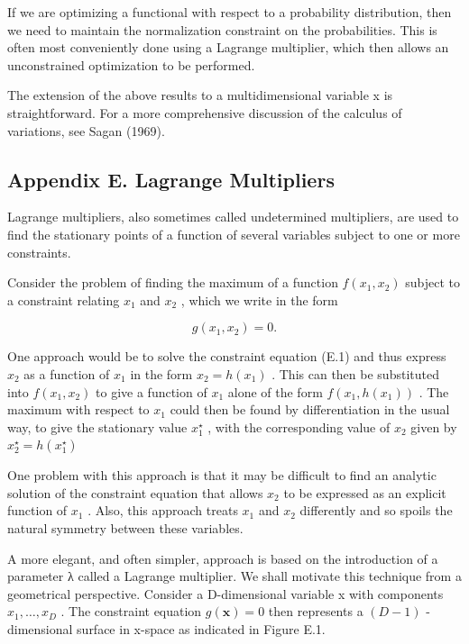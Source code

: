 \documentclass[
  10
]{article}
\begin{document}
If we are optimizing a functional with respect to a probability
distribution, then we need to maintain the normalization constraint on
the probabilities. This is often most conveniently done using a Lagrange
multiplier, which then allows an unconstrained optimization to be
performed.

The extension of the above results to a multidimensional variable x is
straightforward. For a more comprehensive discussion of the calculus of
variations, see Sagan (1969).

\subsection{Appendix E. Lagrange
Multipliers}\label{appendix-e.-lagrange-multipliers}

Lagrange multipliers, also sometimes called undetermined multipliers,
are used to find the stationary points of a function of several
variables subject to one or more constraints.

Consider the problem of finding the maximum of a function
\(f ( x _ { 1 } , x _ { 2 } )\) subject to a constraint relating
\(x _ { 1 }\) and \(x _ { 2 }\) , which we write in the form

\[
g (x _ {1}, x _ {2}) = 0.\tag{E.1}
\]

One approach would be to solve the constraint equation (E.1) and thus
express \(x _ { 2 }\) as a function of \(x _ { 1 }\) in the form
\(x _ { 2 } = h ( x _ { 1 } )\) . This can then be substituted into
\(f ( x _ { 1 } , x _ { 2 } )\) to give a function of \(x _ { 1 }\)
alone of the form \(f ( x _ { 1 } , h ( x _ { 1 } ) )\) . The maximum
with respect to \(x _ { 1 }\) could then be found by differentiation in
the usual way, to give the stationary value \(x _ { 1 } ^ { \star }\) ,
with the corresponding value of \(x _ { 2 }\) given by
\(x _ { 2 } ^ { \star } = h ( x _ { 1 } ^ { \star } )\)

One problem with this approach is that it may be difficult to find an
analytic solution of the constraint equation that allows \(x _ { 2 }\)
to be expressed as an explicit function of \(x _ { 1 }\) . Also, this
approach treats \(x _ { 1 }\) and \(x _ { 2 }\) differently and so
spoils the natural symmetry between these variables.

A more elegant, and often simpler, approach is based on the introduction
of a parameter λ called a Lagrange multiplier. We shall motivate this
technique from a geometrical perspective. Consider a D-dimensional
variable x with components \(x _ { 1 } , \ldots , x _ { D }\) . The
constraint equation \(g ( \mathbf { x } ) = 0\) then represents a
\(( D - 1 )\) -dimensional surface in x-space as indicated in Figure
E.1.
\end{document}
